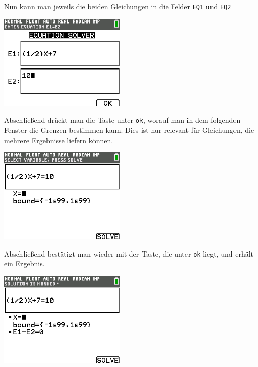 \begin{paracol}{2}
	\begin{flushleft}
	Nun kann man jeweils die beiden Gleichungen in die Felder \texttt{EQ1} und \texttt{EQ2}
	\end{flushleft}	
\switchcolumn
	\begin{flushright}
		\includegraphics[width=6cm]{Media/GRT/Visualisierung/Gleichung_loesen_aequivalent/Gleichung_loesen_aequivalent_3.png}
	\end{flushright}
\end{paracol}

\begin{paracol}{2}
	\begin{flushleft}
	Abschließend drückt man die Taste unter \texttt{ok}, worauf man in dem folgenden Fenster die Grenzen bestimmen kann. Dies ist nur relevant für Gleichungen, die mehrere Ergebnisse liefern können. 
	\end{flushleft}	
\switchcolumn
	\begin{flushright}
		\includegraphics[width=6cm]{Media/GRT/Visualisierung/Gleichung_loesen_aequivalent/Gleichung_loesen_aequivalent_4.png}
	\end{flushright}
\end{paracol}
\begin{paracol}{2}
	\begin{flushleft}
	Abschließend bestätigt man wieder mit der Taste, die unter \texttt{ok} liegt, und erhält ein Ergebnis. 
	\end{flushleft}	
\switchcolumn
	\begin{flushright}
		\includegraphics[width=6cm]{Media/GRT/Visualisierung/Gleichung_loesen_aequivalent/Gleichung_loesen_aequivalent_5.png}
	\end{flushright}
\end{paracol}
